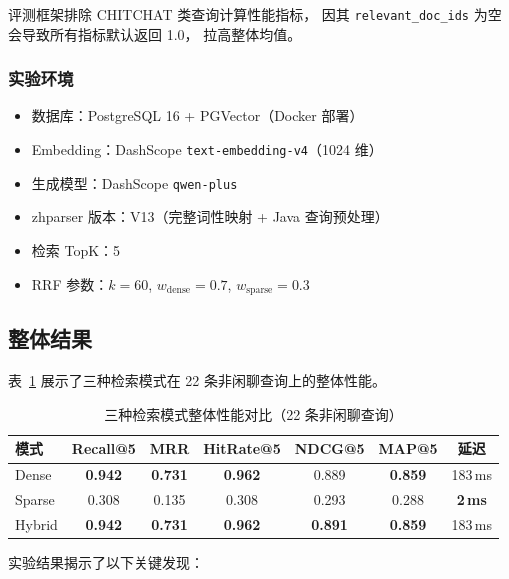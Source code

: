 \documentclass[a4paper, 12pt]{ctexart}
\begin{document}
评测框架排除 CHITCHAT 类查询计算性能指标，
因其 \texttt{relevant\_doc\_ids} 为空会导致所有指标默认返回 1.0，
拉高整体均值。

\subsubsection{实验环境}

\begin{itemize}
  \item 数据库：PostgreSQL 16 + PGVector（Docker 部署）
  \item Embedding：DashScope \texttt{text-embedding-v4}（1024 维）
  \item 生成模型：DashScope \texttt{qwen-plus}
  \item zhparser 版本：V13（完整词性映射 + Java 查询预处理）
  \item 检索 TopK：5
  \item RRF 参数：$k = 60$, $w_{\text{dense}} = 0.7$, $w_{\text{sparse}} = 0.3$
\end{itemize}

\subsection{整体结果}

表~\ref{tab:overall} 展示了三种检索模式在 22 条非闲聊查询上的整体性能。

\begin{table}[H]
  \centering
  \caption{三种检索模式整体性能对比（22 条非闲聊查询）}
  \label{tab:overall}
  \begin{tabular}{lcccccc}
    \toprule
    模式 & Recall@5 & MRR & HitRate@5 & NDCG@5 & MAP@5 & 延迟 \\
    \midrule
    Dense  & \textbf{0.942} & \textbf{0.731} & \textbf{0.962} & 0.889 & \textbf{0.859} & 183\,ms \\
    Sparse & 0.308 & 0.135 & 0.308 & 0.293 & 0.288 & \textbf{2\,ms} \\
    Hybrid & \textbf{0.942} & \textbf{0.731} & \textbf{0.962} & \textbf{0.891} & \textbf{0.859} & 183\,ms \\
    \bottomrule
  \end{tabular}
\end{table}

实验结果揭示了以下关键发现：
\end{document}
